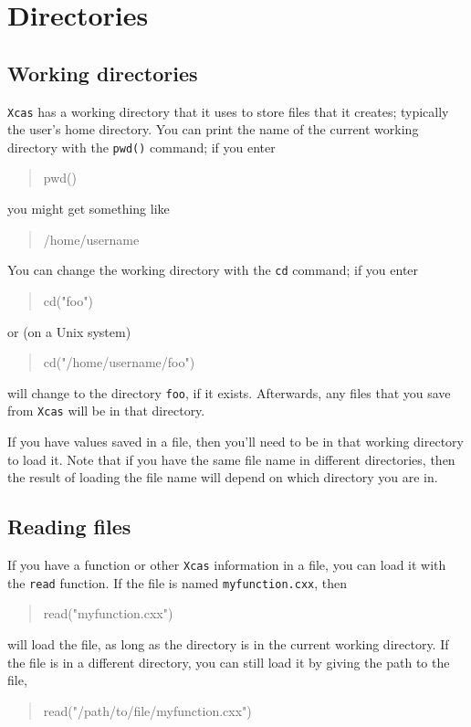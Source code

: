\documentclass[a4paper,11pt]{book}
\newenvironment{giaccmd}
{\begin{quote}\ttfamily}
{\end{quote}}
\begin{document}
\section{Directories}

\subsection{Working directories}

\texttt{Xcas} has a working directory that it uses to store files that
it creates; typically the user's home directory.  You can print the
name of the current working directory with the
\texttt{pwd()} command; if you enter
\begin{giaccmd}
  pwd()
\end{giaccmd}
you might get something like
\begin{giaccmd}
  /home/username
\end{giaccmd}

You can change the working directory with the \texttt{cd}
command; if you enter
\begin{giaccmd}
  cd("foo")
\end{giaccmd}
or (on a Unix system)
\begin{giaccmd}
  cd("/home/username/foo")
\end{giaccmd}
will change to the directory \texttt{foo}, if it exists.
Afterwards, any files that you save from \texttt{Xcas} will be in that
directory.  

If you have values saved in a file, then you'll need to be in that
working directory to load it.  Note that if you have the same file
name in different directories, then the result of loading the file
name will depend on which directory you are in.

\subsection{Reading files}

If you have a function or other \texttt{Xcas} information in a file,
you can load it with the \texttt{read} function.  If the
file is named \texttt{myfunction.cxx}, then
\begin{giaccmd}
  read("myfunction.cxx")
\end{giaccmd}
will load the file, as long as the directory is in the current working
directory.  If the file is in a different directory, you can still
load it by giving the path to the file,
\begin{giaccmd}
  read("/path/to/file/myfunction.cxx")
\end{giaccmd}
\end{document}
